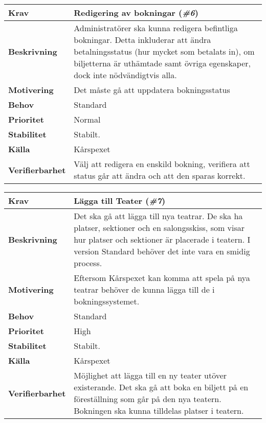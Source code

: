 \documentclass[a4paper, twoside, 11pt, titlepage]{article}
\begin{document}
	\begin{tabular} { p{2.6cm} p{12.5cm} }
		\hline
		\sffamily\textbf{Krav} & Redigering av bokningar (\emph{\#6})  \\
		\hline
		\sffamily\textbf{Beskrivning} & Administratörer ska kunna redigera befintliga bokningar. Detta inkluderar att ändra betalningsstatus (hur mycket som betalats in), om biljetterna är uthämtade samt övriga egenskaper, dock inte nödvändigtvis alla.  \\
		\hline
		\sffamily\textbf{Motivering} & Det måste gå att uppdatera bokningsstatus  \\
		\hline
		\sffamily\textbf{Behov} & Standard  \\
		\hline
		\sffamily\textbf{Prioritet} & Normal  \\
		\hline
		\sffamily\textbf{Stabilitet} & Stabilt.  \\
		\hline
		\sffamily\textbf{Källa} & Kårspexet  \\
		\hline
		\sffamily\textbf{Verifierbarhet} & Välj att redigera en enskild bokning, verifiera att status går att ändra och att den sparas korrekt.  \\
		\hline
	\end{tabular}
	\vspace{6mm}

	\begin{tabular} { p{2.6cm} p{12.5cm} }
		\hline
		\sffamily\textbf{Krav} & Lägga till Teater (\emph{\#7})  \\
		\hline
		\sffamily\textbf{Beskrivning} & Det ska gå att lägga till nya teatrar. De ska ha platser, sektioner och en salongsskiss, som visar hur platser och sektioner är placerade i teatern. I version Standard behöver det inte vara en smidig process.  \\
		\hline
		\sffamily\textbf{Motivering} & Eftersom Kårspexet kan komma att spela på nya teatrar behöver de kunna lägga till de i bokningssystemet.  \\
		\hline
		\sffamily\textbf{Behov} & Standard  \\
		\hline
		\sffamily\textbf{Prioritet} & High  \\
		\hline
		\sffamily\textbf{Stabilitet} & Stabilt.  \\
		\hline
		\sffamily\textbf{Källa} & Kårspexet  \\
		\hline
		\sffamily\textbf{Verifierbarhet} & Möjlighet att lägga till en ny teater utöver existerande. Det ska gå att boka en biljett på en föreställning som går på den nya teatern. Bokningen ska kunna tilldelas platser i teatern.  \\
		\hline
	\end{tabular}
	\vspace{6mm}
\end{document}
